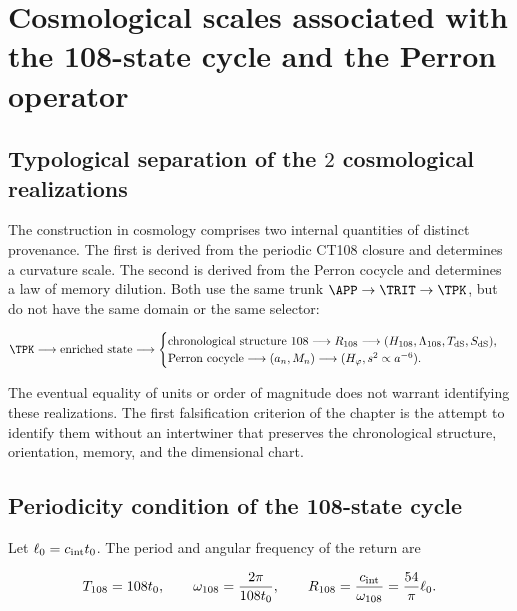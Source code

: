 \section{Cosmological scales associated with the 108-state cycle and the Perron operator}
\label{rm:ch:cosmo}

\subsection{Typological separation of the \(2\) cosmological realizations}

The construction in cosmology comprises two internal quantities of
distinct provenance. The first is derived from the periodic CT108 closure and
determines a curvature scale. The second is derived from the Perron cocycle and
determines a law of memory dilution.
Both use the same trunk \(\APP\to\TRIT\to\TPK\), but do not have the
same domain or the same selector:

{\footnotesize
\begin{equation}
\TPK\longrightarrow\text{enriched state}
\longrightarrow
\begin{cases}
\text{chronological structure }108\longrightarrow
R_{108}\longrightarrow(H_{108},\Lambda_{108},T_{\rm dS},S_{\rm dS}),\\
\text{Perron cocycle}\longrightarrow
(a_n,M_n)\longrightarrow(H_\varphi,s^2\propto a^{-6}).
\end{cases}
\label{rm:eq:cosmo-two-branches}
\end{equation}
}

The eventual equality of units or order of magnitude does not warrant
identifying these realizations. The first falsification criterion of the
chapter is the attempt to identify them without an intertwiner that
preserves the chronological structure, orientation,
memory, and the dimensional chart.

\subsection{Periodicity condition of the 108-state cycle}

Let \(\ell_0=c_{\rm int}t_0\). The period and angular frequency of the return
are

\begin{equation}
T_{108}=108t_0,
\qquad
\omega_{108}=\frac{2\pi}{108t_0},
\qquad
R_{108}=\frac{c_{\rm int}}{\omega_{108}}
=\frac{54}{\pi}\ell_0.
\label{rm:eq:cosmo-R108}
\end{equation}


